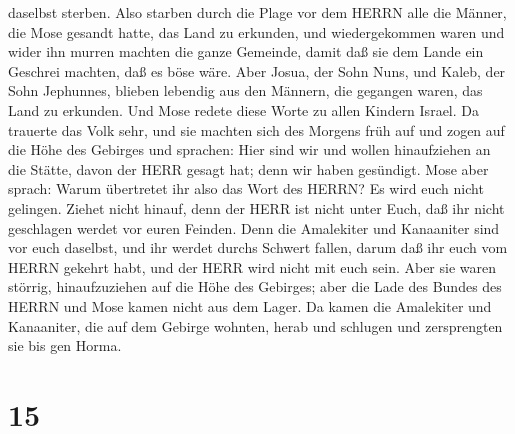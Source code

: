 daselbst sterben.  Also starben durch die Plage vor dem
HERRN alle die Männer, die Mose gesandt hatte, das Land zu erkunden, und
wiedergekommen waren und wider ihn murren machten die ganze Gemeinde,
 damit daß sie dem Lande ein Geschrei machten, daß es böse
wäre.  Aber Josua, der Sohn Nuns, und Kaleb, der Sohn
Jephunnes, blieben lebendig aus den Männern, die gegangen waren, das
Land zu erkunden.  Und Mose redete diese Worte zu allen
Kindern Israel. Da trauerte das Volk sehr,  und sie machten
sich des Morgens früh auf und zogen auf die Höhe des Gebirges und
sprachen: Hier sind wir und wollen hinaufziehen an die Stätte, davon der
HERR gesagt hat; denn wir haben gesündigt.  Mose aber
sprach: Warum übertretet ihr also das Wort des HERRN? Es wird euch nicht
gelingen.  Ziehet nicht hinauf, denn der HERR ist nicht
unter Euch, daß ihr nicht geschlagen werdet vor euren Feinden.
 Denn die Amalekiter und Kanaaniter sind vor euch daselbst,
und ihr werdet durchs Schwert fallen, darum daß ihr euch vom HERRN
gekehrt habt, und der HERR wird nicht mit euch sein.  Aber
sie waren störrig, hinaufzuziehen auf die Höhe des Gebirges; aber die
Lade des Bundes des HERRN und Mose kamen nicht aus dem Lager.
 Da kamen die Amalekiter und Kanaaniter, die auf dem
Gebirge wohnten, herab und schlugen und zersprengten sie bis gen Horma.

\hypertarget{section-14}{%
\section{15}\label{section-14}}

